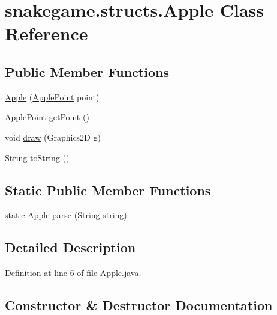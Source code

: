 \hypertarget{classsnakegame_1_1structs_1_1_apple}{}\section{snakegame.\+structs.\+Apple Class Reference}
\label{classsnakegame_1_1structs_1_1_apple}
\subsection*{Public Member Functions}
\begin{DoxyCompactItemize}
\item 
\mbox{\hyperlink{classsnakegame_1_1structs_1_1_apple_a396350cfc8fdecede585381c93150a6d}{Apple}} (\mbox{\hyperlink{classsnakegame_1_1structs_1_1_apple_point}{Apple\+Point}} point)
\item 
\mbox{\hyperlink{classsnakegame_1_1structs_1_1_apple_point}{Apple\+Point}} \mbox{\hyperlink{classsnakegame_1_1structs_1_1_apple_a1c6cf6198f99833004b657097596fd64}{get\+Point}} ()
\item 
void \mbox{\hyperlink{classsnakegame_1_1structs_1_1_apple_ae92b2f9ad12f097c9bfa5f408270f8f2}{draw}} (Graphics2D g)
\item 
String \mbox{\hyperlink{classsnakegame_1_1structs_1_1_apple_abebdf6e508f4ce621f460cd95d498028}{to\+String}} ()
\end{DoxyCompactItemize}
\subsection*{Static Public Member Functions}
\begin{DoxyCompactItemize}
\item 
static \mbox{\hyperlink{classsnakegame_1_1structs_1_1_apple}{Apple}} \mbox{\hyperlink{classsnakegame_1_1structs_1_1_apple_aa7282ddcff4a6529e95e679a2a57ec5b}{parse}} (String string)
\end{DoxyCompactItemize}


\subsection{Detailed Description}


Definition at line 6 of file Apple.\+java.



\subsection{Constructor \& Destructor Documentation}
\mbox{\label{classsnakegame_1_1structs_1_1_apple_a396350cfc8fdecede585381c93150a6d}} 
